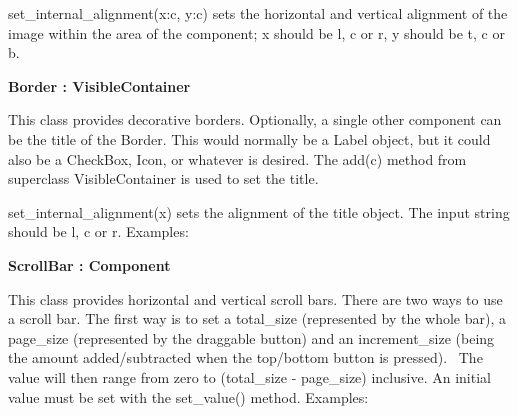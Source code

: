 set\_internal\_alignment(x:{\textquotedbl}c{\textquotedbl},
y:{\textquotedbl}c{\textquotedbl}) sets the horizontal and vertical
alignment of the image within the area of the component; x should be
{\textquotedbl}l{\textquotedbl}, {\textquotedbl}c{\textquotedbl} or
{\textquotedbl}r{\textquotedbl}, y should be
{\textquotedbl}t{\textquotedbl}, {\textquotedbl}c{\textquotedbl} or
{\textquotedbl}b{\textquotedbl}.

{\sffamily\bfseries
{}Border : VisibleContainer}

This class provides decorative borders. Optionally, a single other
component can be the title of the Border. This would normally be a
Label object, but it could also be a CheckBox, Icon, or whatever is
desired. The add(c) method from superclass VisibleContainer is used to
set the title.

set\_internal\_alignment(x) sets the alignment of the title object. The
input string should be {\textquotedbl}l{\textquotedbl},
{\textquotedbl}c{\textquotedbl} or {\textquotedbl}r{\textquotedbl}.
Examples:


{\sffamily\bfseries
{}ScrollBar : Component}

This class provides horizontal and vertical scroll bars. There are two
ways to use a scroll bar. The first way is to set a total\_size
(represented by the whole bar), a page\_size (represented by the
draggable button) and an increment\_size (being the amount
added/subtracted when the top/bottom button is pressed). \ The value
will then range from zero to (total\_size - page\_size) inclusive. An
initial value must be set with the set\_value() method. Examples:


